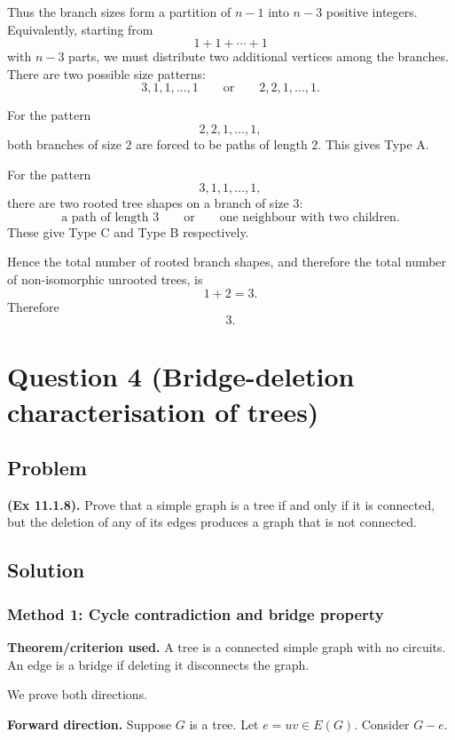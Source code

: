 \documentclass[12pt]{article}
\begin{document}
Thus the branch sizes form a partition of $n-1$ into $n-3$ positive integers. Equivalently, starting from
\[
  1+1+\cdots+1
\]
with $n-3$ parts, we must distribute two additional vertices among the branches. There are two possible size patterns:
\[
  3,1,1,\dots,1
  \qquad\text{or}\qquad
  2,2,1,\dots,1.
\]

For the pattern
\[
  2,2,1,\dots,1,
\]
both branches of size $2$ are forced to be paths of length $2$. This gives Type A.

For the pattern
\[
  3,1,1,\dots,1,
\]
there are two rooted tree shapes on a branch of size $3$:
\[
  \text{a path of length }3
  \qquad\text{or}\qquad
  \text{one neighbour with two children}.
\]
These give Type C and Type B respectively.

Hence the total number of rooted branch shapes, and therefore the total number of non-isomorphic unrooted trees, is
\[
  1+2=3.
\]
Therefore
\[
  \boxed{3}.
\]

\newpage
\section{Question 4 (Bridge-deletion characterisation of trees)}

\subsection{Problem}
\textbf{(Ex 11.1.8).} Prove that a simple graph is a tree if and only if it is connected, but the deletion of any of its edges produces a graph that is not connected.

\subsection{Solution}

\subsubsection{Method 1: Cycle contradiction and bridge property}
\textbf{Theorem/criterion used.} A tree is a connected simple graph with no circuits. An edge is a bridge if deleting it disconnects the graph.

We prove both directions.

\medskip
\noindent
\textbf{Forward direction.} Suppose $G$ is a tree. Let $e=uv\in E(G)$. Consider $G-e$.
\end{document}
